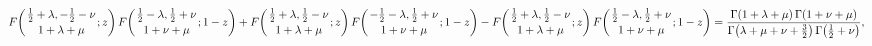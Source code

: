 \[\mathop{F\/}\nolimits\!\left({\frac{1}{2}+\lambda,-\frac{1}{2}-\nu\atop 1+%
\lambda+\mu};z\right)\mathop{F\/}\nolimits\!\left({\frac{1}{2}-\lambda,\frac{1%
}{2}+\nu\atop 1+\nu+\mu};1-z\right)+\mathop{F\/}\nolimits\!\left({\frac{1}{2}+%
\lambda,\frac{1}{2}-\nu\atop 1+\lambda+\mu};z\right)\mathop{F\/}\nolimits\!%
\left({-\frac{1}{2}-\lambda,\frac{1}{2}+\nu\atop 1+\nu+\mu};1-z\right)-\mathop%
{F\/}\nolimits\!\left({\frac{1}{2}+\lambda,\frac{1}{2}-\nu\atop 1+\lambda+\mu}%
;z\right)\mathop{F\/}\nolimits\!\left({\frac{1}{2}-\lambda,\frac{1}{2}+\nu%
\atop 1+\nu+\mu};1-z\right)=\frac{\mathop{\Gamma\/}\nolimits\!\left(1+\lambda+%
\mu\right)\mathop{\Gamma\/}\nolimits\!\left(1+\nu+\mu\right)}{\mathop{\Gamma\/%
}\nolimits\!\left(\lambda+\mu+\nu+\frac{3}{2}\right)\mathop{\Gamma\/}\nolimits%
\!\left(\frac{1}{2}+\nu\right)},\]
